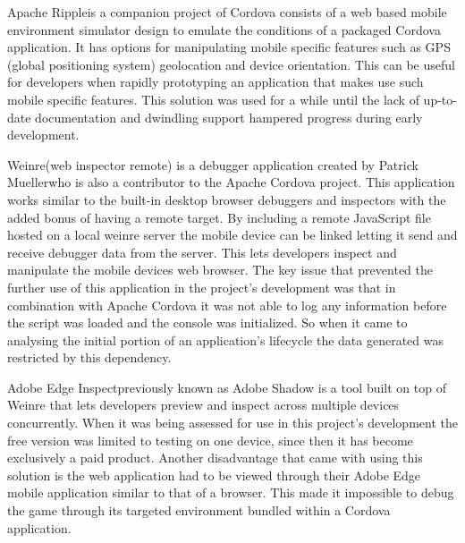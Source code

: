 \documentclass[final]{cmpreport}
\begin{document}
Apache Ripple\footnotemark is a companion project of Cordova consists of a web based mobile environment simulator design to emulate the conditions of a packaged Cordova application. It has options for manipulating mobile specific features such as GPS (global positioning system) geolocation and device orientation. This can be useful for developers when rapidly prototyping an application that makes use such mobile specific features. This solution was used for a while until the lack of up-to-date documentation and dwindling support hampered progress during early development.


Weinre\footnotemark (web inspector remote) is a debugger application created by Patrick Mueller\footnotemark who is also a contributor to the Apache Cordova project. This application works similar to the built-in desktop browser debuggers and inspectors with the added bonus of having a remote target. By including a remote JavaScript file hosted on a local weinre server the mobile device can be linked letting it send and receive debugger data from the server. This lets developers inspect and manipulate the mobile devices web browser. The key issue that prevented the further use of this application in the project's development was that in combination with Apache Cordova it was not able to log any information before the script was loaded and the console was initialized. So when it came to analysing the initial portion of an application's lifecycle the data generated was restricted by this dependency.


Adobe Edge Inspect\footnotemark previously known as Adobe Shadow is a tool built on top of Weinre that lets developers preview and inspect across multiple devices concurrently. 
When it was being assessed for use in this project's development the free version was limited to testing on one device, since then it has become exclusively a paid product. Another disadvantage that came with using this solution is the web application had to be viewed through their Adobe Edge mobile application similar to that of a browser. This made it impossible to debug the game through its targeted environment bundled within a Cordova application.

\end{document}
